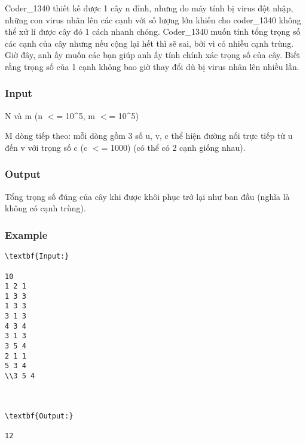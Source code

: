 

Coder\_1340 thiết kế được 1 cây n đỉnh, nhưng do máy tính bị virus đột nhập, những con virus nhân lên các cạnh với số lượng lớn khiến cho coder\_1340 không thể xử lí được cây đó 1 cách nhanh chóng. Coder\_1340 muốn tính tổng trọng số các cạnh của cây nhưng nếu cộng lại hết thì sẽ sai, bởi vì có nhiều cạnh trùng. Giờ đây, anh ấy muốn các bạn giúp anh ấy tính chính xác trọng số của cây. Biết rằng trọng số của 1 cạnh không bao giờ thay đổi dù bị virus nhân lên nhiều lần.

\subsubsection{Input}

N và m (n $<$= 10\textasciicircum5, m $<$= 10\textasciicircum5)

M dòng tiếp theo: mỗi dòng gồm 3 số u, v, c thể hiện đường nối trực tiếp từ u đến v với trọng số c (c $<$= 1000) (có thể có 2 cạnh giống nhau).

\subsubsection{Output}

Tổng trọng số đúng của cây khi được khôi phục trở lại như ban đầu (nghĩa là không có cạnh trùng).

\subsubsection{Example}
\begin{verbatim}
\textbf{Input:}

10
1 2 1
1 3 3
1 3 3
3 1 3
4 3 4
3 1 3
3 5 4
2 1 1
5 3 4
\\3 5 4



\textbf{Output:}

12

\end{verbatim}
